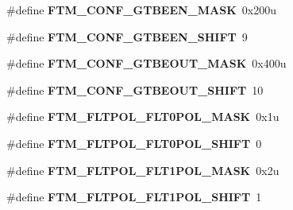 \begin{DoxyCompactItemize}
\item 
\#define {\bfseries F\+T\+M\+\_\+\+C\+O\+N\+F\+\_\+\+G\+T\+B\+E\+E\+N\+\_\+\+M\+A\+SK}~0x200u\hypertarget{group__FTM__Register__Masks_ga2ab518e33ed4bcb533a022f469c62994}{}\label{group__FTM__Register__Masks_ga2ab518e33ed4bcb533a022f469c62994}

\item 
\#define {\bfseries F\+T\+M\+\_\+\+C\+O\+N\+F\+\_\+\+G\+T\+B\+E\+E\+N\+\_\+\+S\+H\+I\+FT}~9\hypertarget{group__FTM__Register__Masks_ga08e28bc089eeea68a240bb8e716172d8}{}\label{group__FTM__Register__Masks_ga08e28bc089eeea68a240bb8e716172d8}

\item 
\#define {\bfseries F\+T\+M\+\_\+\+C\+O\+N\+F\+\_\+\+G\+T\+B\+E\+O\+U\+T\+\_\+\+M\+A\+SK}~0x400u\hypertarget{group__FTM__Register__Masks_ga172965c1d295c0edcc7454a96bc03430}{}\label{group__FTM__Register__Masks_ga172965c1d295c0edcc7454a96bc03430}

\item 
\#define {\bfseries F\+T\+M\+\_\+\+C\+O\+N\+F\+\_\+\+G\+T\+B\+E\+O\+U\+T\+\_\+\+S\+H\+I\+FT}~10\hypertarget{group__FTM__Register__Masks_gab3cdb8493cf40ad27cd27b513fc618ec}{}\label{group__FTM__Register__Masks_gab3cdb8493cf40ad27cd27b513fc618ec}

\item 
\#define {\bfseries F\+T\+M\+\_\+\+F\+L\+T\+P\+O\+L\+\_\+\+F\+L\+T0\+P\+O\+L\+\_\+\+M\+A\+SK}~0x1u\hypertarget{group__FTM__Register__Masks_gac9a93adce89d23693d4895ea49c95fb0}{}\label{group__FTM__Register__Masks_gac9a93adce89d23693d4895ea49c95fb0}

\item 
\#define {\bfseries F\+T\+M\+\_\+\+F\+L\+T\+P\+O\+L\+\_\+\+F\+L\+T0\+P\+O\+L\+\_\+\+S\+H\+I\+FT}~0\hypertarget{group__FTM__Register__Masks_gaced2a4f6b0cfb4d3f76b81ed36f56188}{}\label{group__FTM__Register__Masks_gaced2a4f6b0cfb4d3f76b81ed36f56188}

\item 
\#define {\bfseries F\+T\+M\+\_\+\+F\+L\+T\+P\+O\+L\+\_\+\+F\+L\+T1\+P\+O\+L\+\_\+\+M\+A\+SK}~0x2u\hypertarget{group__FTM__Register__Masks_gaa7b2fdfe55a6efb22cd8df8b071cac7c}{}\label{group__FTM__Register__Masks_gaa7b2fdfe55a6efb22cd8df8b071cac7c}

\item 
\#define {\bfseries F\+T\+M\+\_\+\+F\+L\+T\+P\+O\+L\+\_\+\+F\+L\+T1\+P\+O\+L\+\_\+\+S\+H\+I\+FT}~1\hypertarget{group__FTM__Register__Masks_ga9b9e4e91e33926535a3b8f981f3058d6}{}\label{group__FTM__Register__Masks_ga9b9e4e91e33926535a3b8f981f3058d6}


\end{DoxyCompactItemize}
